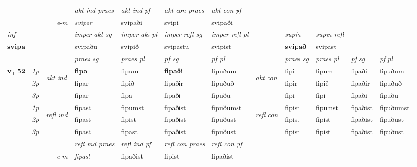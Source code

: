 \begin{longtable}[l]{X>{\footnotesize\itshape}llXXXXlXXXX}
   && &  \textit{akt ind praes} & \textit{akt ind pf} & \textit{akt con praes} & \textit{akt con pf} \\*
\multicolumn{3}{r}{\textit{e-m}} & svipar & svipaði & svipi & svipaði \\*

\cmidrule{4-7}
   {\textit{inf}} & &  & \textit{imper akt sg} & \textit{imper akt pl} & \textit{imper refl sg} & \textit{imper refl pl}  && \textit{supin} & \textit{supin refl}  \\*
  {\textbf{svipa}} & && svipaðu  & svipið & svipastu & svipist  &&  \textbf{svipað} & svipast  \\*

\midrule

 & &   & \textit{praes sg}  & \textit{praes pl}    & \textit{ pf sg} & \textit{pf pl} & & \textit{praes sg}  & \textit{praes pl}    & \textit{pf sg} & \textit{pf pl }  \\ \cmidrule{4-7} \cmidrule{9-12}
 \multirow{2}{*}{{{\textbf{v{\textsubscript{1}}} \Large{\textbf{52}}}}}  & 1p & \multirow{3}{*}{\begin{turn}{90}\textit{akt ind}\end{turn}} & \textbf{fipa} & fipum & \textbf{fipaði} & fipuðum & \multirow{3}{*}{\begin{turn}{90}\textit{akt con}\end{turn}} &fipi & fipum & fipaði & fipuðum\\*
 & 2p &  &  fipar  & fipið & fipaðir & fipuðuð & & fipir & fipið & fipaðir & fipuðuð \\*
 & 3p &  & fipar & fipa & fipaði & fipuðu & & fipi & fipi& fipaði & fipuðu \\*
\cmidrule{4-7} \cmidrule{9-12}
 & 1p & \multirow{3}{*}{\begin{turn}{90}\textit{refl ind}\end{turn}}  & fipast & fipumst & fipaðist & fipuðumst & \multirow{3}{*}{\begin{turn}{90}\textit{refl con}\end{turn}}  &fipist & fipumst & fipaðist & fipuðumst \\*
 & 2p &  & fipast & fipist & fipaðist & fipuðust & &fipist & fipist & fipaðist & fipuðust \\*
 & 3p  & & fipast & fipast & fipaðist & fipuðust & & fipist & fipist& fipaðist & fipuðust \\*
\cmidrule{4-7} \cmidrule{9-12}

 & && \textit{refl ind praes} & \textit{refl ind pf} & \textit{refl con praes} & \textit{refl con pf} \\*
\multicolumn{3}{r}{\textit{e-m}}& fipast & fipaðist & fipist & fipaðist \\*


\end{longtable}
